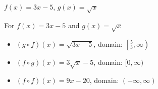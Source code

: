 {$f(x) = 3x-5$, $g(x) = \sqrt{x}$ }
{For   $f(x) = 3x-5$ and $g(x) = \sqrt{x}$ 

\begin{itemize}

\item  $(g \circ f)(x) = \sqrt{3x-5}$, domain: $\left[ \frac{5}{3}, \infty \right)$

\item  $(f \circ g)(x) = 3\sqrt{x}-5$, domain: $[0,\infty)$

\item  $(f \circ f)(x) = 9x-20$, domain: $(-\infty, \infty)$

\end{itemize}}
